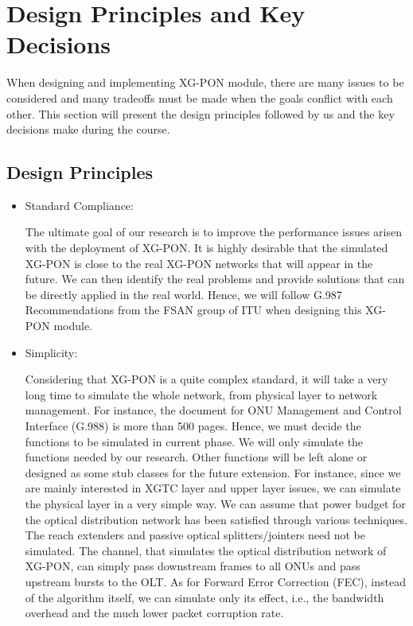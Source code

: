 \section{Design Principles and Key Decisions} \label{section_choices}

When designing and implementing XG-PON module, there are many
issues to be considered and many tradeoffs must be made when the
goals conflict with each other. This section will present the
design principles followed by us and the key decisions make during
the course.

\subsection{Design Principles}

\begin{itemize}

\item{Standard Compliance:}

The ultimate goal of our research is to improve the performance
issues arisen with the deployment of XG-PON. It is highly
desirable that the simulated XG-PON is close to the real XG-PON
networks that will appear in the future. We can then identify the
real problems and provide solutions that can be directly applied
in the real world. Hence, we will follow G.987 Recommendations
from the FSAN group of ITU when designing this XG-PON module.


\item{Simplicity:}

Considering that XG-PON is a quite complex standard, it will take
a very long time to simulate the whole network, from physical
layer to network management. For instance, the document for ONU
Management and Control Interface (G.988) is more than 500 pages.
Hence, we must decide the functions to be simulated in current
phase. We will only simulate the functions needed by our research.
Other functions will be left alone or designed as some stub
classes for the future extension. For instance, since we are
mainly interested in XGTC layer and upper layer issues, we can
simulate the physical layer in a very simple way. We can assume
that power budget for the optical distribution network has been
satisfied through various techniques. The reach extenders and
passive optical splitters/jointers need not be simulated. The
channel, that simulates the optical distribution network of
XG-PON, can simply pass downstream frames to all ONUs and pass
upstream bursts to the OLT. As for Forward Error Correction (FEC),
instead of the algorithm itself, we can simulate only its effect,
i.e., the bandwidth overhead and the much lower packet corruption
rate.



\end{itemize}
